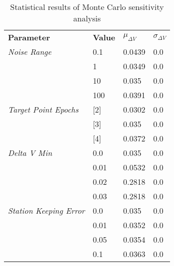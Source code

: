 
                    \begin{table}[]
                    \centering
                    \begin{tabular}{l l l l}
                    \rowcolor[HTML]{EFEFEF} \textbf{Parameter} & \textbf{Value} & \textbf{$\mu_{\Delta V}$} & \textbf{$\sigma_{\Delta V}$} \\
                    \textit{Noise Range} & 0.1 & 0.0439 & 0.0 \\
 & 1 & 0.0349 & 0.0 \\
 & 10 & 0.035 & 0.0 \\
 & 100 & 0.0391 & 0.0 \\
\textit{Target Point Epochs} & [2] & 0.0302 & 0.0 \\
 & [3] & 0.035 & 0.0 \\
 & [4] & 0.0372 & 0.0 \\
\textit{Delta V Min} & 0.0 & 0.035 & 0.0 \\
 & 0.01 & 0.0532 & 0.0 \\
 & 0.02 & 0.2818 & 0.0 \\
 & 0.03 & 0.2818 & 0.0 \\
\textit{Station Keeping Error} & 0.0 & 0.035 & 0.0 \\
 & 0.01 & 0.0352 & 0.0 \\
 & 0.05 & 0.0354 & 0.0 \\
 & 0.1 & 0.0363 & 0.0 \\

                    \end{tabular}
                    \caption{Statistical results of Monte Carlo sensitivity analysis}
                    \label{tab:SensitivityAnalysis}
                    \end{table}
                    